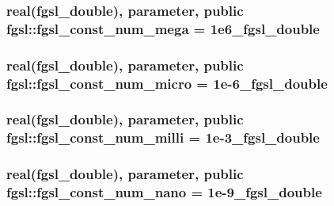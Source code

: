 \subsubsection[{fgsl\+\_\+const\+\_\+num\+\_\+mega}]{\setlength{\rightskip}{0pt plus 5cm}real({\bf fgsl\+\_\+double}), parameter, public fgsl\+::fgsl\+\_\+const\+\_\+num\+\_\+mega = 1e6\+\_\+fgsl\+\_\+double}\label{namespacefgsl_a3783a70eb7db5888129ccf2094415129}
\hypertarget{namespacefgsl_aa7d0f5804ffc72dc0ecddbee234cd51d}{}
\subsubsection[{fgsl\+\_\+const\+\_\+num\+\_\+micro}]{\setlength{\rightskip}{0pt plus 5cm}real({\bf fgsl\+\_\+double}), parameter, public fgsl\+::fgsl\+\_\+const\+\_\+num\+\_\+micro = 1e-\/6\+\_\+fgsl\+\_\+double}\label{namespacefgsl_aa7d0f5804ffc72dc0ecddbee234cd51d}
\hypertarget{namespacefgsl_a3fb5efe0ae67e7937ba05e8f184e2d35}{}
\subsubsection[{fgsl\+\_\+const\+\_\+num\+\_\+milli}]{\setlength{\rightskip}{0pt plus 5cm}real({\bf fgsl\+\_\+double}), parameter, public fgsl\+::fgsl\+\_\+const\+\_\+num\+\_\+milli = 1e-\/3\+\_\+fgsl\+\_\+double}\label{namespacefgsl_a3fb5efe0ae67e7937ba05e8f184e2d35}
\hypertarget{namespacefgsl_a18d57365a461c2adc8f4e0ddb4c690d6}{}
\subsubsection[{fgsl\+\_\+const\+\_\+num\+\_\+nano}]{\setlength{\rightskip}{0pt plus 5cm}real({\bf fgsl\+\_\+double}), parameter, public fgsl\+::fgsl\+\_\+const\+\_\+num\+\_\+nano = 1e-\/9\+\_\+fgsl\+\_\+double}\label{namespacefgsl_a18d57365a461c2adc8f4e0ddb4c690d6}
\hypertarget{namespacefgsl_aa124eb86407291ed14158b0802d02029}{}
